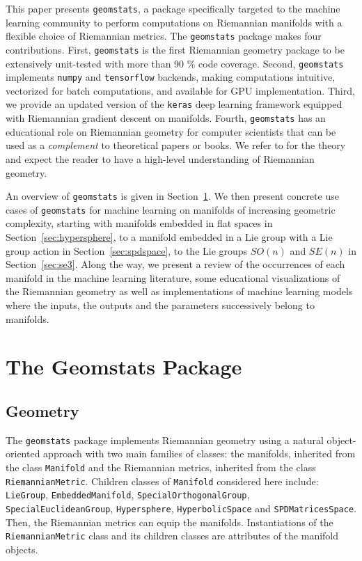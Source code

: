 \documentclass{article}
\begin{document}

This paper presents \texttt{geomstats}, a package specifically targeted to the machine learning community to perform computations on Riemannian manifolds with a flexible choice of Riemannian metrics. The \texttt{geomstats} package makes four contributions. First, \texttt{geomstats} is the first Riemannian geometry package to be extensively unit-tested with more than 90 \% code coverage. Second, \texttt{geomstats} implements \texttt{numpy} \cite{numpy} and \texttt{tensorflow} \cite{tensorflow} backends, making computations intuitive, vectorized for batch computations, and available for GPU implementation. Third, we provide an updated version of the \texttt{keras} deep learning framework equipped with Riemannian gradient descent on manifolds. Fourth, \texttt{geomstats} has an educational role on Riemannian geometry for computer scientists that can be used as a \textit{complement} to theoretical papers or books. We refer to \cite{Postnikov2001} for the theory and expect the reader to have a high-level understanding of Riemannian geometry.

An overview of \texttt{geomstats} is given in Section~\ref{sec:geomstats}. We then present concrete use cases of \texttt{geomstats} for machine learning on manifolds of increasing geometric complexity, starting with manifolds embedded in flat spaces in Section~\ref{sec:hypersphere}, to a manifold embedded in a Lie group with a Lie group action in Section~\ref{sec:spdspace}, to the Lie groups $SO(n)$ and $SE(n)$ in Section~\ref{sec:se3}. Along the way, we present a review of the occurrences of each manifold in the machine learning literature, some educational visualizations of the Riemannian geometry as well as implementations of machine learning models where the inputs, the outputs and the parameters successively belong to manifolds.


\section{The Geomstats Package}\label{sec:geomstats}

\subsection{Geometry}

The \texttt{geomstats} package implements Riemannian geometry using a natural object-oriented approach with two main families of classes: the manifolds, inherited from the class \texttt{Manifold} and the Riemannian metrics, inherited from the class \texttt{RiemannianMetric}. Children classes of \texttt{Manifold} considered here include: \texttt{LieGroup}, \texttt{EmbeddedManifold}, \texttt{SpecialOrthogonalGroup}, \texttt{SpecialEuclideanGroup}, \texttt{Hypersphere}, \texttt{HyperbolicSpace} and \texttt{SPDMatricesSpace}. Then, the Riemannian metrics can equip the manifolds. Instantiations of the \texttt{RiemannianMetric} class and its children classes are attributes of the manifold objects.
\end{document}
